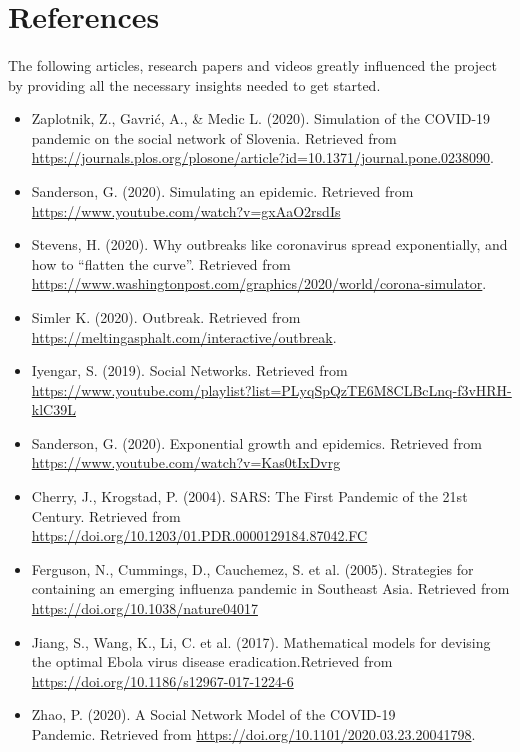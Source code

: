 \documentclass[14pt, a4paper]{extarticle}
\begin{document}
	\newpage
	\section{References}
	    \paragraph{} The following articles, research papers and videos greatly influenced the project by providing all the necessary insights needed to get started.
    	
        \begin{itemize}
            \item Zaplotnik, Z., Gavrić, A., \& Medic L. (2020). Simulation of the COVID-19 pandemic on the social network of Slovenia. Retrieved from \url{https://journals.plos.org/plosone/article?id=10.1371/journal.pone.0238090}.
            
            \item Sanderson, G. (2020). Simulating an epidemic. Retrieved from \url{https://www.youtube.com/watch?v=gxAaO2rsdIs}
            
            \item Stevens, H. (2020). Why outbreaks like coronavirus spread exponentially, and how to “flatten the curve”. Retrieved from \url{https://www.washingtonpost.com/graphics/2020/world/corona-simulator}.
            
            \item Simler K. (2020). Outbreak. Retrieved from \url{https://meltingasphalt.com/interactive/outbreak}.
            
            \item Iyengar, S. (2019). Social Networks. Retrieved from \url{https://www.youtube.com/playlist?list=PLyqSpQzTE6M8CLBcLnq-f3vHRH-klC39L}
            
            \item Sanderson, G. (2020). Exponential growth and epidemics. Retrieved from \url{https://www.youtube.com/watch?v=Kas0tIxDvrg}
            
            \item Cherry, J., Krogstad, P. (2004). SARS: The First Pandemic of the 21st Century. Retrieved from \url{https://doi.org/10.1203/01.PDR.0000129184.87042.FC}
            
            \item Ferguson, N., Cummings, D., Cauchemez, S. et al. (2005). Strategies for containing an emerging influenza pandemic in Southeast Asia. Retrieved from \url{https://doi.org/10.1038/nature04017}
            
            \item Jiang, S., Wang, K., Li, C. et al. (2017). Mathematical models for devising the optimal Ebola virus disease eradication.Retrieved from \url{https://doi.org/10.1186/s12967-017-1224-6}
            
            \item Zhao, P. (2020). A Social Network Model of the COVID-19 \\Pandemic. Retrieved from \url{https://doi.org/10.1101/2020.03.23.20041798}.
        \end{itemize}
	
\end{document}
